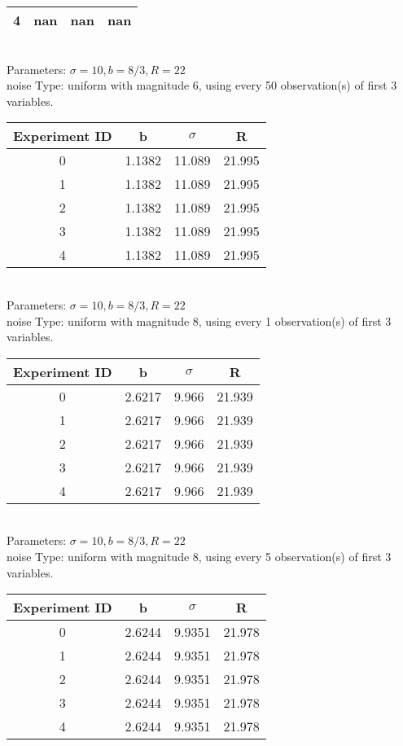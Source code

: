 \begin{multicols}{3}
\begin{tabular}{cccc}
 4 & nan & nan & nan\\ \hline 
 \end{tabular}\\
Parameters: $\sigma=10, b=8/3, R=22$\\
noise Type: uniform with magnitude 6, using every 50 observation(s) of first 3 variables.\\
\begin{tabular}{cccc}
\hline Experiment ID & b & $\sigma$ & R \\ \hline 
0 & 1.1382 & 11.089 & 21.995\\ \hline 
 1 & 1.1382 & 11.089 & 21.995\\ \hline 
 2 & 1.1382 & 11.089 & 21.995\\ \hline 
 3 & 1.1382 & 11.089 & 21.995\\ \hline 
 4 & 1.1382 & 11.089 & 21.995\\ \hline 
 \end{tabular}\\
Parameters: $\sigma=10, b=8/3, R=22$\\
noise Type: uniform with magnitude 8, using every 1 observation(s) of first 3 variables.\\
\begin{tabular}{cccc}
\hline Experiment ID & b & $\sigma$ & R \\ \hline 
0 & 2.6217 & 9.966 & 21.939\\ \hline 
 1 & 2.6217 & 9.966 & 21.939\\ \hline 
 2 & 2.6217 & 9.966 & 21.939\\ \hline 
 3 & 2.6217 & 9.966 & 21.939\\ \hline 
 4 & 2.6217 & 9.966 & 21.939\\ \hline 
 \end{tabular}\\
Parameters: $\sigma=10, b=8/3, R=22$\\
noise Type: uniform with magnitude 8, using every 5 observation(s) of first 3 variables.\\
\begin{tabular}{cccc}
\hline Experiment ID & b & $\sigma$ & R \\ \hline 
0 & 2.6244 & 9.9351 & 21.978\\ \hline 
 1 & 2.6244 & 9.9351 & 21.978\\ \hline 
 2 & 2.6244 & 9.9351 & 21.978\\ \hline 
 3 & 2.6244 & 9.9351 & 21.978\\ \hline 
 4 & 2.6244 & 9.9351 & 21.978\\ \hline 

\end{tabular}
\end{multicols}
